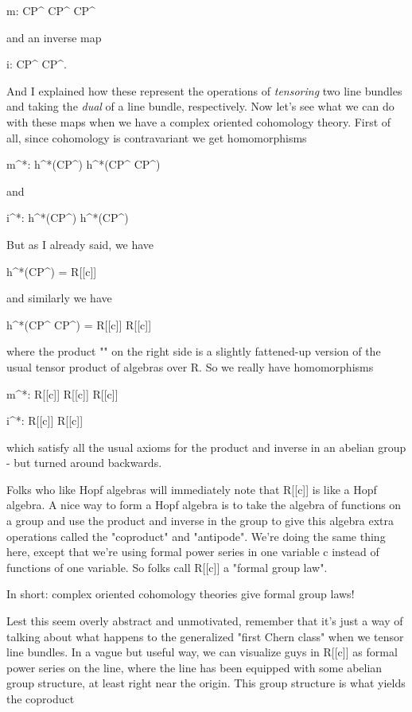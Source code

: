 m: CP^{\infty } \times  CP^{\infty } \to  CP^{\infty } 

and an inverse map

i: CP^{\infty } \to  CP^{\infty }.

And I explained how these represent the operations of \emph{tensoring} two
line bundles and taking the \emph{dual} of a line bundle, respectively.   Now
let's see what we can do with these maps when we have a complex oriented
cohomology theory.  First of all, since cohomology is contravariant we
get homomorphisms

m^{*}: h^{*}(CP^{\infty }) \to  h^{*}(CP^{\infty } \times  CP^{\infty })

and

i^{*}: h^{*}(CP^{\infty }) \to  h^{*}(CP^{\infty })

But as I already said, we have

h^{*}(CP^{\infty }) = R[[c]]

and similarly we have

h^{*}(CP^{\infty } \times  CP^{\infty }) = 
R[[c]] \otimes  R[[c]]

where the product "\otimes " on the right side is a slightly fattened-up
version of the usual tensor product of algebras over R.  So we really
have homomorphisms

m^{*}: R[[c]] \to  R[[c]] \otimes  R[[c]]

i^{*}: R[[c]] \to  R[[c]]

which satisfy all the usual axioms for the product and inverse in an
abelian group - but turned around backwards.

Folks who like Hopf algebras will immediately note that R[[c]] is like a
Hopf algebra.  A nice way to form a Hopf algebra is to take the algebra
of functions on a group and use the product and inverse in the group to
give this algebra extra operations called the "coproduct" and 
"antipode".  
We're doing the same thing here, except that we're using formal power
series in one variable c instead of functions of one variable.  So folks
call R[[c]] a "formal group law".  

In short: complex oriented cohomology theories give formal group laws!

Lest this seem overly abstract and unmotivated, remember that it's just
a way of talking about what happens to the generalized "first Chern
class" when we tensor line bundles.  In a vague but useful way, we can
visualize guys in R[[c]] as formal power series on the line, where the
line has been equipped with some abelian group structure, at least 
right near the origin.  This group structure is what yields the coproduct

